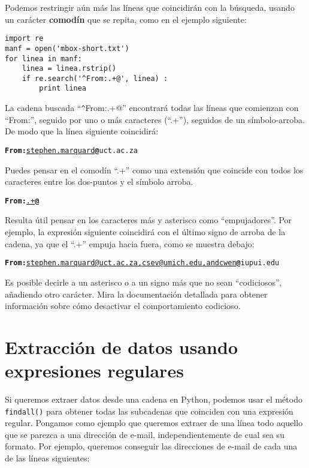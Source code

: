 Podemos restringir aún más las líneas que coincidirán con la búsqueda, usando un carácter {\bf comodín}
que se repita, como en el ejemplo siguiente:

\beforeverb
\begin{verbatim}
import re
manf = open('mbox-short.txt')
for linea in manf:
    linea = linea.rstrip()
    if re.search('^From:.+@', linea) :
        print linea
\end{verbatim}
\afterverb
%
La cadena buscada ``\verb"^"From:.+@'' encontrará todas las líneas que comienzan con ``From:'',
seguido por uno o más caracteres (``.+''), seguidos de un símbolo-arroba. De modo que la
línea siguiente coincidirá:

\beforeverb
\begin{alltt}
{\bf From:}\underline{ stephen.marquard}{\bf @}uct.ac.za
\end{alltt}
\afterverb

Puedes pensar en el comodín ``.+'' como una extensión que coincide con todos los caracteres
entre los dos-puntos y el símbolo arroba.

\beforeverb
\begin{alltt}
{\bf From:}\underline{.+}{\bf @}
\end{alltt}
\afterverb

Resulta útil pensar en los caracteres más y asterisco como ``empujadores''. Por ejemplo, la expresión
siguiente coincidirá con el último signo de arroba de la cadena, ya que el ``.+'' empuja hacia fuera,
como se muestra debajo:

\beforeverb
\begin{alltt}
{\bf From:}\underline{ stephen.marquard@uct.ac.za, csev@umich.edu, and cwen}{\bf @}iupui.edu
\end{alltt}
\afterverb

Es posible decirle a un asterisco o a un signo más que no sean ``codiciosos'', añadiendo
otro carácter. Mira la documentación detallada para obtener información sobre cómo desactivar
el comportamiento codicioso.

\section{Extracción de datos usando expresiones regulares}

Si queremos extraer datos desde una cadena en Python, podemos usar el método {\tt findall()} para
obtener todas las subcadenas que coinciden con una expresión regular. Pongamos como ejemplo que
queremos extraer de una línea todo aquello que se parezca a una dirección de e-mail, independientemente
de cual sea su formato. Por ejemplo, queremos conseguir las direcciones de e-mail de cada una de las
líneas siguientes:

